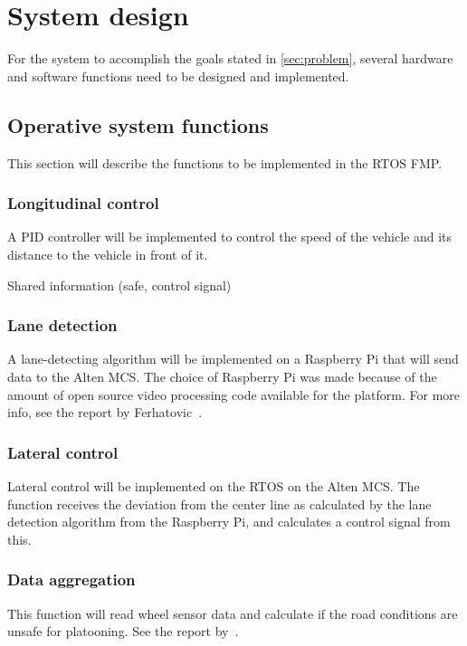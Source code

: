 \chapter{System design}
\label{sec:system_design}
For the system to accomplish the goals stated in \ref{sec:problem}, several hardware and software functions need to be designed and implemented.\\


\section{Operative system functions}
This section will describe the functions to be implemented in the RTOS FMP.

\subsection{Longitudinal control}
A PID controller will be implemented to control the speed of the vehicle and its distance to the vehicle in front of it.

Shared information (safe, control signal)

\subsection{Lane detection}
A lane-detecting algorithm will be implemented on a Raspberry Pi that will send data to the Alten MCS. The choice of Raspberry Pi was made because of the amount of open source video processing code available for the platform. For more info, see the report by Ferhatovic~\cite{ferhatovic2017}.

\subsection{Lateral control}
Lateral control will be implemented on the RTOS on the Alten MCS. The function receives the deviation from the center line as calculated by the lane detection algorithm from the Raspberry Pi, and calculates a control signal from this.

\subsection{Data aggregation}
This function will read wheel sensor data and calculate if the road conditions are unsafe for platooning. See the report by~\cite{hellman2017}.

